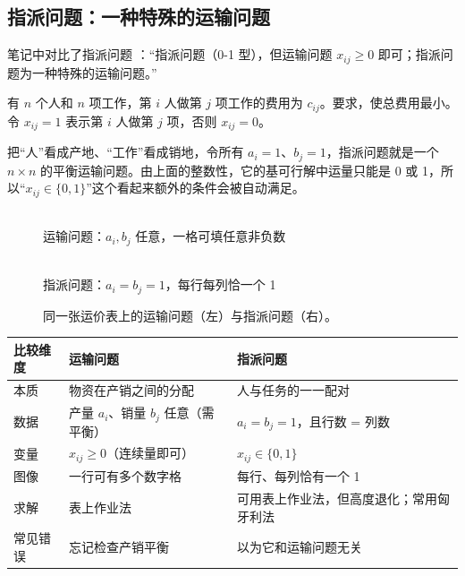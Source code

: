 \subsection{指派问题：一种特殊的运输问题}
笔记中对比了指派问题 \orig：“指派问题（0-1 型），但运输问题 $x_{ij}\ge0$ 即可；指派问题为一种特殊的运输问题。”

\begin{definitionbox}[指派问题]
有 $n$ 个人和 $n$ 项工作，第 $i$ 人做第 $j$ 项工作的费用为 $c_{ij}$。要求，使总费用最小。令 $x_{ij}=1$ 表示第 $i$ 人做第 $j$ 项，否则 $x_{ij}=0$。
\end{definitionbox}
\supp 把“人”看成产地、“工作”看成销地，令所有 $a_i=1$、$b_j=1$，指派问题就是一个 $n\times n$ 的平衡运输问题。由上面的整数性，它的基可行解中运量只能是 0 或 1，所以“$x_{ij}\in\{0,1\}$”这个看起来额外的条件会被自动满足。
\begin{figure}[H]
\centering
\begin{minipage}{0.48\linewidth}\centering
{}\\{\small 运输问题：$a_i,b_j$ 任意，一格可填任意非负数}
\end{minipage}\hfill
\begin{minipage}{0.48\linewidth}\centering
{}\\{\small 指派问题：$a_i=b_j=1$，每行每列恰一个 1}
\end{minipage}
\caption{同一张运价表上的运输问题（左）与指派问题（右）。}\label{fig:assign}
\end{figure}
\begin{center}\small
\begin{tabularx}{\linewidth}{@{}lXX@{}}
\toprule
比较维度 & 运输问题 & 指派问题\\
\midrule
本质 & 物资在产销之间的分配 & 人与任务的一一配对\\
数据 & 产量 $a_i$、销量 $b_j$ 任意（需平衡） & $a_i=b_j=1$，且行数 = 列数\\
变量 & $x_{ij}\ge0$（连续量即可） & $x_{ij}\in\{0,1\}$\\
图像 & 一行可有多个数字格 & 每行、每列恰有一个 1\\
求解 & 表上作业法 & 可用表上作业法，但高度退化；常用匈牙利法\\
常见错误 & 忘记检查产销平衡 & 以为它和运输问题无关\\
\bottomrule
\end{tabularx}
\end{center}

